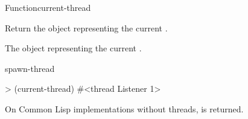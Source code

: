 \begin{functiondoc}{Function}{current-thread}{\noargs{} 
    \returns{} }
%

\fnsyntax

\fnpurpose Return the object representing the current .

\fnpackage {}

\fnmodule {}

\fnreturns The object representing the current . 

\begin{alsos}{spawn-thread}
\end{alsos}

\fnexample
%
\W\supp
\begin{example}
> (current-thread)
#<thread Listener 1>
\end{example}

\fnnote On Common Lisp implementations without threads,
 is returned.

\end{functiondoc}


